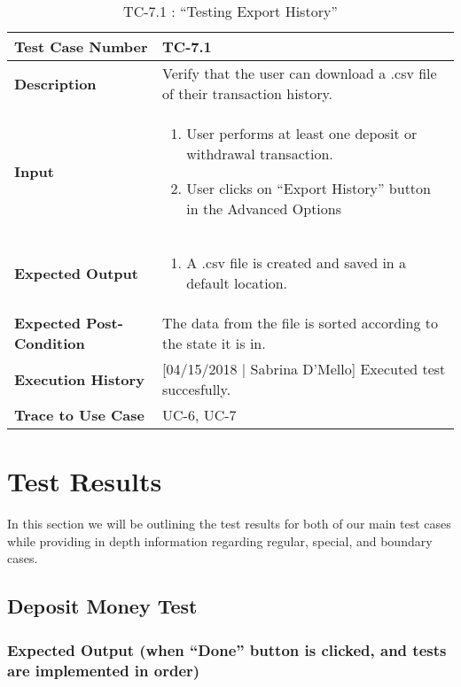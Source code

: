 \documentclass[12pt]{article}
\begin{document}
\begin{table}[H]
\caption{TC-7.1 : “Testing Export History”}
\begin{center}
\begin{tabular}{|p{5.5	cm}|p{11cm}|}
  \hline
  \bf Test Case Number & TC-7.1\\\hline
  \bf Description & Verify that the user can download a .csv file of their transaction history.\\\hline
  \bf Input &
  \begin{enumerate}
  \item User performs at least one deposit or withdrawal transaction.
  \item User clicks on ``Export History'' button in the Advanced Options
  \end{enumerate}
  \\\hline
  \bf Expected Output &
  \begin{enumerate}
  \item A .csv file is created and saved in a default location.
  \end{enumerate}
  \\\hline
  \bf Expected Post-Condition & The data from the file is sorted according to the state it is in.\\\hline
  \bf Execution History & [04/15/2018 | Sabrina D'Mello] Executed test succesfully.\\\hline
  \bf Trace to Use Case & UC-6, UC-7\\

  \hline
\end{tabular}
\end{center}
\end{table}

\section{Test Results}

In this section we will be outlining the test results for both of our main test cases while providing in depth information regarding regular, special, and boundary cases. 

\subsection{Deposit Money Test}

\subsubsection{Expected Output (when ``Done'' button is clicked, and tests are implemented in order)}
\end{document}
